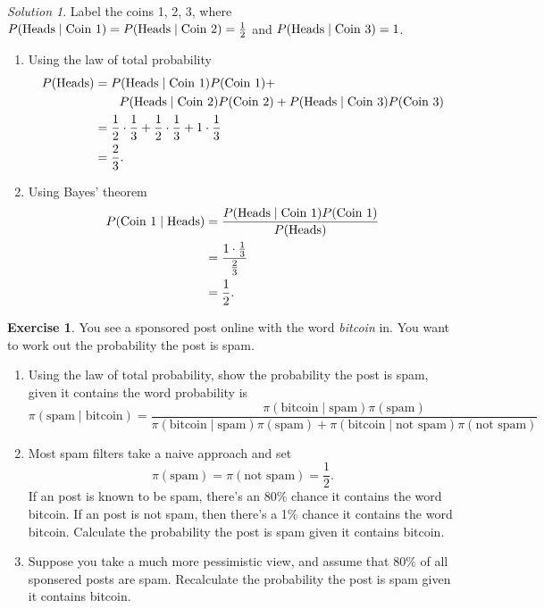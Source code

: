 \documentclass[
]{book}
\providecommand{\tightlist}{%
  \setlength{\itemsep}{0pt}\setlength{\parskip}{0pt}}
\theoremstyle{definition}
\theoremstyle{definition}
\theoremstyle{definition}
\newtheorem{exercise}{Exercise}[chapter]
\theoremstyle{definition}
\theoremstyle{remark}
\newtheorem*{solution}{Solution}
\begin{document}
\begin{solution}

Label the coins 1, 2, 3, where \(P(\hbox{Heads} \mid \hbox{Coin } 1) = P(\hbox{Heads} \mid \hbox{Coin } 2) = \frac{1}{2}\) and \(P(\hbox{Heads} \mid \hbox{Coin } 3) = 1\).

\begin{enumerate}
\def\labelenumi{\arabic{enumi}.}
\item
  Using the law of total probability
  \begin{align*}
  P(\hbox{Heads}) & = P(\hbox{Heads} \mid \hbox{Coin } 1) P(\hbox{Coin } 1) + \\
  & \qquad  P(\hbox{Heads} \mid \hbox{Coin } 2) P(\hbox{Coin } 2) + P(\hbox{Heads} \mid \hbox{Coin } 3) P(\hbox{Coin } 3) \\
  & = \frac{1}{2}\cdot\frac{1}{3} + \frac{1}{2}\cdot\frac{1}{3} + 1\cdot\frac{1}{3} \\
  & = \frac{2}{3}.
  \end{align*}
\item
  Using Bayes' theorem
  \begin{align*}
  P(\hbox{Coin 1}\mid \hbox{Heads}) &= \frac{P(\hbox{Heads} \mid \hbox{Coin 1})P(\hbox{Coin 1})}{P(\hbox{Heads})} \\
  & = \frac{1\cdot\frac{1}{3}}{\frac{2}{3}} \\
  & = \frac{1}{2}.
  \end{align*}
\end{enumerate}

\end{solution}

\begin{exercise}

You see a sponsored post online with the word \emph{bitcoin} in. You want to work out the probability the post is spam.

\begin{enumerate}
\def\labelenumi{\arabic{enumi}.}
\tightlist
\item
  Using the law of total probability, show the probability the post is spam, given it contains the word probability is
  \[
    \pi(\textrm{spam} \mid \textrm{bitcoin}) = \frac{\pi(\textrm{bitcoin} \mid \textrm{spam})\pi(\textrm{spam})}{\pi(\textrm{bitcoin} \mid \textrm{spam})\pi(\textrm{spam}) + \pi(\textrm{bitcoin} \mid \textrm{not spam})\pi(\textrm{not spam})}
    \]
\item
  Most spam filters take a naive approach and set
  \[
    \pi(\textrm{spam}) =\pi(\textrm{not spam}) = \frac{1}{2}. 
    \]
  If an post is known to be spam, there's an 80\% chance it contains the word bitcoin. If an post is not spam, then there's a 1\% chance it contains the word bitcoin. Calculate the probability the post is spam given it contains bitcoin.
\item
  Suppose you take a much more pessimistic view, and assume that 80\% of all sponsered posts are spam. Recalculate the probability the post is spam given it contains bitcoin.
\end{enumerate}

\end{exercise}
\end{document}
